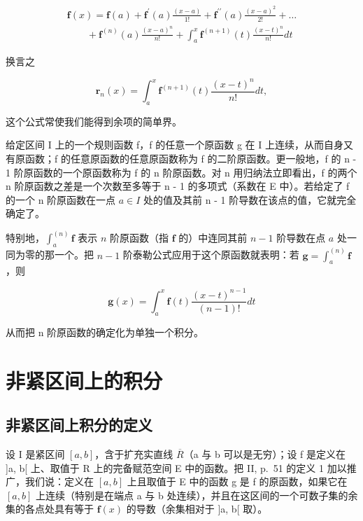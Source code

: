 \[
\begin{array}{l} \mathbf {f} (x) = \mathbf {f} (a) + \mathbf {f} ^ {\prime} (a) \frac {(x - a)}{1 !} + \mathbf {f} ^ {\prime \prime} (a) \frac {(x - a) ^ {2}}{2 !} + \dots \\ \qquad + \mathbf {f} ^ {(n)} (a) \frac {(x - a) ^ {n}}{n !} + \int_ {a} ^ {x} \mathbf {f} ^ {(n + 1)} (t) \frac {(x - t) ^ {n}}{n !} d t \end{array}\tag{17}
\]

换言之

\[
\mathbf {r} _ {n} (x) = \int_ {a} ^ {x} \mathbf {f} ^ {(n + 1)} (t) \frac {(x - t) ^ {n}}{n !} d t,\tag{18}
\]

这个公式常使我们能得到余项的简单界。

给定区间 I 上的一个规则函数 f，f 的任意一个原函数 g 在 I 上连续，从而自身又有原函数；f 的任意原函数的任意原函数称为 f 的二阶原函数。更一般地，f 的 n - 1 阶原函数的一个原函数称为 f 的 n 阶原函数。对 n 用归纳法立即看出，f 的两个 n 阶原函数之差是一个次数至多等于 n - 1 的多项式（系数在 E 中）。若给定了 f 的一个 n 阶原函数在一点 \(a \in I\) 处的值及其前 n - 1 阶导数在该点的值，它就完全确定了。

特别地，\(\int_{a}^{(n)}\mathbf{f}\) 表示 \(n\) 阶原函数（指 \(\mathbf{f}\) 的）中连同其前 \(n - 1\) 阶导数在点 \(a\) 处一同为零的那一个。把 \(n - 1\) 阶泰勒公式应用于这个原函数就表明：若 \(\mathbf{g} = \int_{a}^{(n)}\mathbf{f}\)，则

\[
\mathbf {g} (x) = \int_ {a} ^ {x} \mathbf {f} (t) \frac {(x - t) ^ {n - 1}}{(n - 1) !} d t\tag{19}
\]

从而把 n 阶原函数的确定化为单独一个积分。

\section{非紧区间上的积分}

\subsection{非紧区间上积分的定义}

设 I 是紧区间 \([a, b]\)，含于扩充实直线 \(\overline{R}\)（a 与 b 可以是无穷）；设 f 是定义在 {]}a, b{[} 上、取值于 R 上的完备赋范空间 E 中的函数。把 II, p.~51 的定义 1 加以推广，我们说：定义在 \([a, b]\) 上且取值于 E 中的函数 g 是 f 的原函数，如果它在 \([a, b]\) 上连续（特别是在端点 a 与 b 处连续），并且在这区间的一个可数子集的余集的各点处具有等于 \(\mathbf{f}(x)\) 的导数（余集相对于 {]}a, b{[} 取）。

